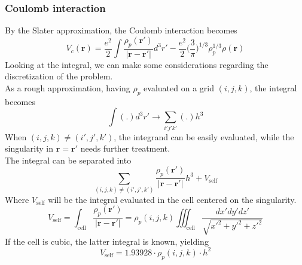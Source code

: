 \subsubsection{Coulomb interaction}
By the Slater approximation, the Coulomb interaction becomes
\begin{equation}
    V_c(\mathbf r) = \frac{e^2}{2}\int \frac{\rho_p(\mathbf r')}{|\mathbf r-\mathbf r'|} d^3 r' - \frac{e^2}{2}\bigg(\frac {3}{\pi}\bigg)^{1/3}\rho_p^{1/3}\rho(\mathbf r)
\end{equation}
Looking at the integral, we can make some considerations regarding the discretization of the problem.
\\As a rough approximation, having $\rho_p$ evaluated on a grid $(i, j, k)$, the integral becomes
\[\int (.)d^3 r' \to \sum_{i'j'k'} (.) h^3\]
When $(i, j, k)\neq (i', j', k')$, the integrand can be easily evaluated, while the singularity in $\mathbf r = \mathbf r'$ needs further treatment.
\\The integral can be separated into 
\[\sum_{(i, j, k)\neq (i', j', k')} \frac{\rho_p(\mathbf r')}{|\mathbf r-\mathbf r'|} h^3 + V_\text{self} \]
Where $V_\text{self}$ will be the integral evaluated in the cell centered on the singularity.
\[V_\text{self} = \int_{\text{cell}}\frac{\rho_p(\mathbf r')}{|\mathbf r-\mathbf r'|} = \rho_p(i, j, k)\iiint_{\text{cell}}\frac{dx'dy'dz'}{\sqrt{x'^2+y'^2+z'^2}}\]
If the cell is cubic, the latter integral is known, yielding
\[V_\text{self} = 1.93928\cdot\rho_p(i, j, k)\cdot h^2\]


